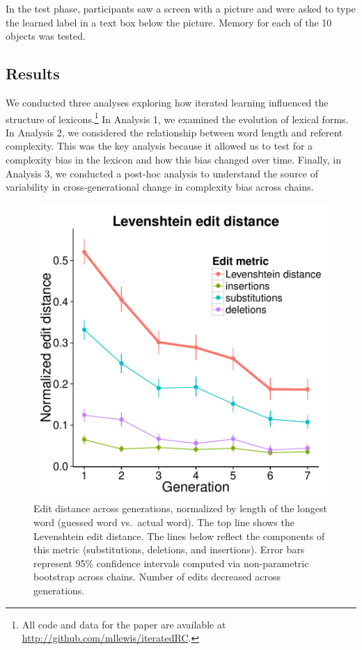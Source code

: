 In the test phase, participants saw a screen with a picture and were asked to type the learned label in a text box below the picture. Memory for each of the 10 objects was tested.





\subsection{Results}



We conducted three analyses exploring how iterated learning influenced the structure of lexicons.\footnote{All code and data for the paper are available at \url{http://github.com/mllewis/iteratedRC}.} In Analysis 1, we examined the evolution of lexical forms. In Analysis  2, we considered the relationship between word length and referent complexity. This was the key analysis because it allowed us to test for a complexity bias in the lexicon and how this bias changed over time. Finally, in Analysis  3, we conducted a post-hoc analysis to understand the source of variability in cross-generational change in complexity bias across chains.

\begin{figure}[t]
\begin{center}
\includegraphics[width = .7\linewidth]{figs/lev.pdf}
\end{center}
\vspace{-.5em}
\caption{Edit distance across generations, normalized by length of the longest word (guessed word vs.\ actual word). The top line shows the Levenshtein edit distance. The lines below reflect the components of this metric (substitutions, deletions, and insertions). Error bars represent 95\% confidence intervals computed via non-parametric bootstrap across chains. Number of edits decreased across generations.}
\label{fig:lev}
\vspace{-1em}
\end{figure}

